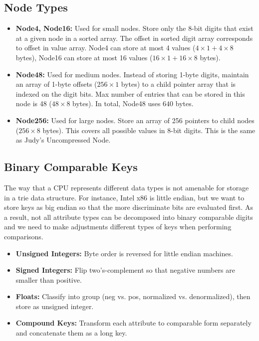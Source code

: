 \documentclass[11pt]{article}
\begin{document}
\subsection*{Node Types}
\begin{itemize}
    \item \textbf{Node4, Node16:} Used for small nodes. Store only the 8-bit digits that exist at a given node in a sorted array. The offset in sorted digit array corresponds to offset in value array. Node4 can store at most 4 values ($4\times1 + 4\times8$ bytes), Node16 can store at most 16 values ($16\times1 + 16\times8$ bytes). 
    \item \textbf{Node48:} Used for medium nodes. Instead of storing 1-byte digits, maintain an array of 1-byte offsets ($256\times1$ bytes) to a child pointer array that is indexed on the digit bits. Max number of entries that can be stored in this node is 48 ($48\times8$ bytes). In total, Node48 uses $640$ bytes.
    \item \textbf{Node256:} Used for large nodes. Store an array of 256 pointers to child nodes ($256\times8$ bytes). This covers all possible values in 8-bit digits. This is the same as Judy's Uncompressed Node.
\end{itemize}

\subsection*{Binary Comparable Keys}
The way that a CPU represents different data types is not amenable for storage in a trie data structure. For instance, Intel x86 is little endian, but we want to store keys as big endian so that the more discriminate bits are evaluated first. As a result, not all attribute types can be decomposed into binary comparable digits and we need to make adjustments different types of keys when performing comparisons.
\begin{itemize}
    \item \textbf{Unsigned Integers:} Byte order is reversed for little endian machines.
    \item \textbf{Signed Integers:} Flip two’s-complement so that negative numbers are smaller than positive.
    \item \textbf{Floats:} Classify into group (neg vs. pos, normalized vs. denormalized), then store as unsigned integer.
    \item \textbf{Compound Keys:} Transform each attribute to comparable form separately and concatenate them as a long key.
\end{itemize}
\end{document}
